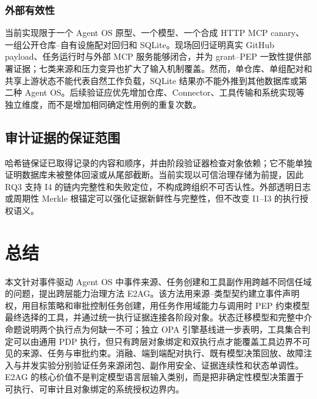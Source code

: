 \subsubsection{外部有效性}

当前实现限于一个 Agent OS 原型、一个模型、一个合成 HTTP MCP canary、一组公开仓库--自有设施配对回归和 SQLite。现场回归证明真实 GitHub payload、任务运行时与外部 MCP 服务能够闭合，并为 grant--PEP 一致性提供部署证据；七类来源和压力变异也扩大了输入机制覆盖。然而，单仓库、单组配对和共享上游状态不能代表自然工作负载，SQLite 结果亦不能外推到其他数据库或第二种 Agent OS。后续验证应优先增加仓库、Connector、工具传输和系统实现等独立维度，而不是增加相同确定性用例的重复次数。

\subsection{审计证据的保证范围}

哈希链保证已取得记录的内容和顺序，并由阶段验证器检查对象依赖；它不能单独证明数据库未被整体回滚或从尾部截断。当前实现以可信治理存储为前提，因此 RQ3 支持 I4 的链内完整性和失败定位，不构成跨组织不可否认性。外部透明日志或周期性 Merkle 根锚定可以强化证据新鲜性与完整性，但不改变 I1--I3 的执行授权语义。

\section{总结}\label{sec:conclusion-v11}

本文针对事件驱动 Agent OS 中事件来源、任务创建和工具副作用跨越不同信任域的问题，提出跨层能力治理方法 E2AG。该方法用来源--类型契约建立事件声明权，用目标策略和审批控制任务创建，用任务作用域能力与调用时 PEP 约束模型最终选择的工具，并通过统一执行证据连接各阶段对象。状态迁移模型和完整中介命题说明两个执行点为何缺一不可；独立 OPA 引擎基线进一步表明，工具集合判定可以由通用 PDP 执行，但只有跨层对象绑定和双执行点才能覆盖工具边界不可见的来源、任务与审批约束。消融、端到端配对执行、既有模型决策回放、故障注入与并发实验分别验证任务来源闭包、副作用安全、证据连续性和状态单调性。E2AG 的核心价值不是判定模型语言层输入类别，而是把非确定性模型决策置于可执行、可审计且对象绑定的系统授权边界内。

